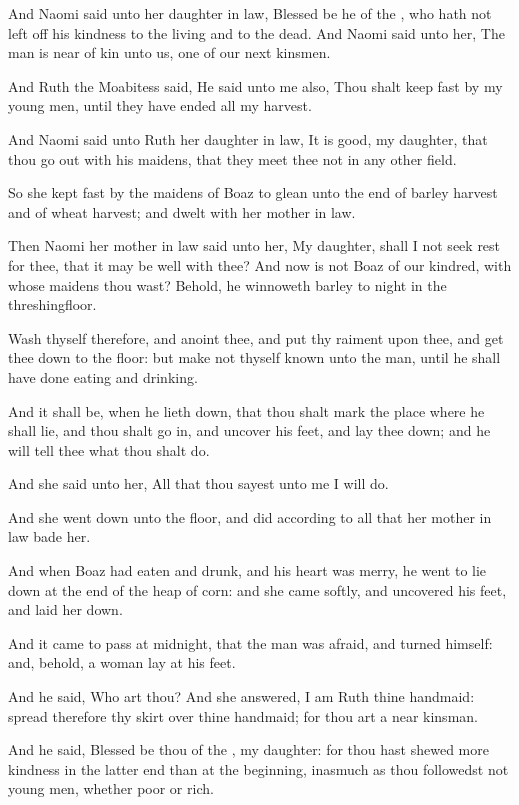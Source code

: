 \Verse And Naomi said unto her daughter in law, Blessed be he of the \LORD, who hath not left off his kindness to the living and to the dead. And Naomi said unto her, The man is near of kin unto us, one of our next kinsmen.

\Verse And Ruth the Moabitess said, He said unto me also, Thou shalt keep fast by my young men, until they have ended all my harvest.

\Verse And Naomi said unto Ruth her daughter in law, It is good, my daughter, that thou go out with his maidens, that they meet thee not in any other field.

\Verse So she kept fast by the maidens of Boaz to glean unto the end of barley harvest and of wheat harvest; and dwelt with her mother in law.


\Chapter
\Verse Then Naomi her mother in law said unto her, My daughter, shall I not seek rest for thee, that it may be well with thee?  \Verse And now is not Boaz of our kindred, with whose maidens thou wast?  Behold, he winnoweth barley to night in the threshingfloor.

\Verse Wash thyself therefore, and anoint thee, and put thy raiment upon thee, and get thee down to the floor: but make not thyself known unto the man, until he shall have done eating and drinking.

\Verse And it shall be, when he lieth down, that thou shalt mark the place where he shall lie, and thou shalt go in, and uncover his feet, and lay thee down; and he will tell thee what thou shalt do.

\Verse And she said unto her, All that thou sayest unto me I will do.

\Verse And she went down unto the floor, and did according to all that her mother in law bade her.

\Verse And when Boaz had eaten and drunk, and his heart was merry, he went to lie down at the end of the heap of corn: and she came softly, and uncovered his feet, and laid her down.

\Verse And it came to pass at midnight, that the man was afraid, and turned himself: and, behold, a woman lay at his feet.

\Verse And he said, Who art thou? And she answered, I am Ruth thine handmaid: spread therefore thy skirt over thine handmaid; for thou art a near kinsman.

\Verse And he said, Blessed be thou of the \LORD, my daughter: for thou hast shewed more kindness in the latter end than at the beginning, inasmuch as thou followedst not young men, whether poor or rich.

